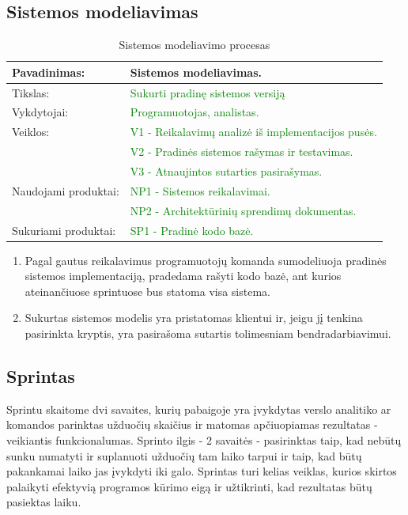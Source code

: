 \documentclass{VUMIFPSkursinis}
\begin{document}
	\newpage

	\subsection{Sistemos modeliavimas}
	\begin{center}
		\begin{table}[ht]
			\caption{Sistemos modeliavimo procesas}
			\begin{tabular}{ | l | l | }
				\hline
				Pavadinimas:		& Sistemos modeliavimas.				\\ \hline
				Tikslas:		&\textcolor{green}{ Sukurti pradinę sistemos versiją}			\\ \hline
				Vykdytojai:		& \textcolor{green}{Programuotojas, analistas.}				\\ \hline
				Veiklos:		&\textcolor{green}{ V1 - Reikalavimų analizė iš implementacijos pusės.}	\\
							&\textcolor{green}{ V2 - Pradinės sistemos rašymas ir testavimas.	}	\\
							& \textcolor{green}{V3 - Atnaujintos sutarties pasirašymas.}		\\ \hline
				Naudojami produktai:	& \textcolor{green}{NP1 - Sistemos reikalavimai. }				\\
							& \textcolor{green}{NP2 - Architektūrinių sprendimų dokumentas.}		\\ \hline
				Sukuriami produktai:	& \textcolor{green}{SP1 - Pradinė kodo bazė. }				\\
			\end{tabular}
		\end{table}
	\end{center}

	\begin{enumerate}
		\item Pagal gautus reikalavimus programuotojų komanda sumodeliuoja pradinės sistemos implementaciją, pradedama rašyti kodo bazė, ant kurios ateinančiuose sprintuose bus statoma visa sistema.
		\item Sukurtas sistemos modelis yra pristatomas klientui ir, jeigu jį tenkina pasirinkta kryptis, yra pasirašoma sutartis tolimesniam bendradarbiavimui.
	\end{enumerate}

	\subsection{Sprintas}
	Sprintu skaitome dvi savaites, kurių pabaigoje yra įvykdytas verslo analitiko ar komandos parinktas užduočių skaičius ir matomas apčiuopiamas rezultatas - veikiantis funkcionalumas.
	Sprinto ilgis - 2 savaitės - pasirinktas taip, kad nebūtų sunku numatyti ir suplanuoti užduočių tam laiko tarpui ir taip, kad būtų pakankamai laiko jas įvykdyti iki galo.
	Sprintas turi kelias veiklas, kurios skirtos palaikyti efektyvią programos kūrimo eigą ir užtikrinti, kad rezultatas būtų pasiektas laiku.
\end{document}
